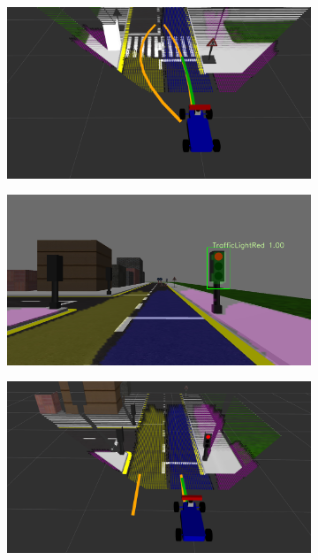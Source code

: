 \begin{figure}[h]
\begin{subfigure}[b]{0.45\linewidth}
  \end{subfigure}
  \begin{subfigure}[b]{0.45\linewidth}
    \includegraphics[width=\linewidth]{figures/experiments/pedestrian-crossing-go-pc.png}
  \end{subfigure}
  \begin{subfigure}[b]{0.45\linewidth}
    \includegraphics[width=\linewidth]{figures/experiments/red-light-stop-img.png}
  \end{subfigure}
  \begin{subfigure}[b]{0.45\linewidth}
    \includegraphics[width=\linewidth]{figures/experiments/red-light-stop-pc.png}

\end{subfigure}
\end{figure}
